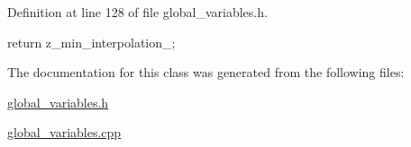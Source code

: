 Definition at line 128 of file global\-\_\-variables.\-h.


\begin{DoxyCode}
{return z_min_interpolation_;}
\end{DoxyCode}


The documentation for this class was generated from the following files\-:\begin{DoxyCompactItemize}
\item 
\hyperlink{global__variables_8h}{global\-\_\-variables.\-h}\item 
\hyperlink{global__variables_8cpp}{global\-\_\-variables.\-cpp}\end{DoxyCompactItemize}
